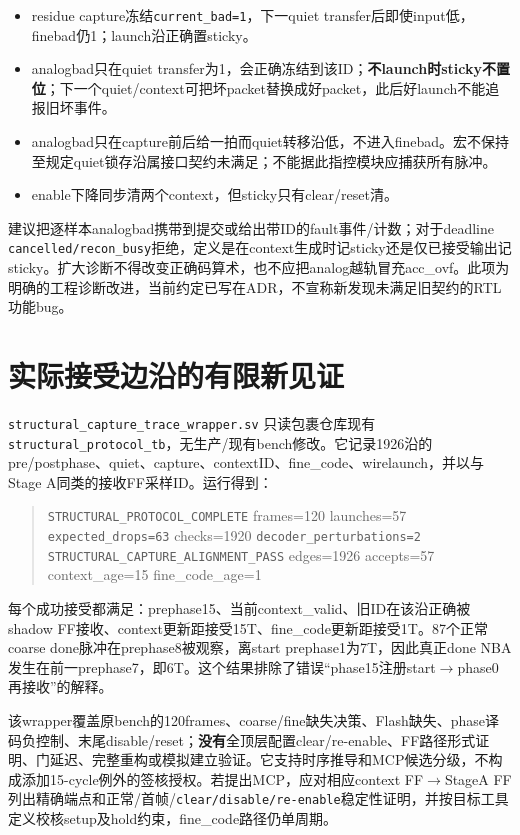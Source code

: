 \documentclass[UTF8,fontset=fandol,10pt,a4paper,openany]{ctexrep}
\newcommand{\code}[1]{\nolinkurl{#1}}
\begin{document}
\begin{itemize}
\item residue capture冻结\code{current_bad=1}，下一quiet transfer后即使input低，finebad仍1；launch沿正确置sticky。
\item analogbad只在quiet transfer为1，会正确冻结到该ID；\textbf{不launch时sticky不置位}；下一个quiet/context可把坏packet替换成好packet，此后好launch不能追报旧坏事件。
\item analogbad只在capture前后给一拍而quiet转移沿低，不进入finebad。宏不保持至规定quiet锁存沿属接口契约未满足；不能据此指控模块应捕获所有脉冲。
\item enable下降同步清两个context，但sticky只有clear/reset清。
\end{itemize}


建议把逐样本analogbad携带到提交或给出带ID的fault事件/计数；对于deadline \code{cancelled/recon_busy}拒绝，定义是在context生成时记sticky还是仅已接受输出记sticky。扩大诊断不得改变正确码算术，也不应把analog越轨冒充acc\_ovf。此项为明确的工程诊断改进，当前约定已写在ADR，不宣称新发现未满足旧契约的RTL功能bug。


\section{实际接受边沿的有限新见证}


\code{structural_capture_trace_wrapper.sv} 只读包裹仓库现有 \code{structural_protocol_tb}，无生产/现有bench修改。它记录1926沿的pre/postphase、quiet、capture、contextID、fine\_code、wirelaunch，并以与Stage A同类的接收FF采样ID。运行得到：


\begin{quote}\small\ttfamily\raggedright
\code{STRUCTURAL_PROTOCOL_COMPLETE} frames=120 launches=57 \code{expected_drops=63} checks=1920 \code{decoder_perturbations=2}\\\code{STRUCTURAL_CAPTURE_ALIGNMENT_PASS} edges=1926 accepts=57 context\_age=15 fine\_code\_age=1
\end{quote}


每个成功接受都满足：prephase15、当前context\_valid、旧ID在该沿正确被shadow FF接收、context更新距接受15T、fine\_code更新距接受1T。87个正常coarse done脉冲在prephase8被观察，离start prephase1为7T，因此真正done NBA发生在前一prephase7，即6T。这个结果排除了错误“phase15注册start\ensuremath{\rightarrow}phase0再接收”的解释。


该wrapper覆盖原bench的120frames、coarse/fine缺失决策、Flash缺失、phase译码负控制、末尾disable/reset；\textbf{没有}全顶层配置clear/re-enable、FF路径形式证明、门延迟、完整重构或模拟建立验证。它支持时序推导和MCP候选分级，不构成添加15-cycle例外的签核授权。若提出MCP，应对相应context FF\ensuremath{\rightarrow}StageA FF列出精确端点和正常/首帧/\code{clear/disable/re-enable}稳定性证明，并按目标工具定义校核setup及hold约束，fine\_code路径仍单周期。
\end{document}
